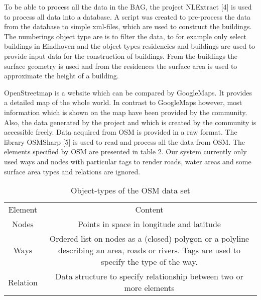 To be able to process all the data in the BAG, the project NLExtract [4] is used to process all data into a database. A script was created to pre-process the data from the database to simple xml-files, which are used to construct the buildings. The numberings object type are is to filter the data, to for example only select buildings in Eindhoven and the object types residencies and buildings are used to provide input data for the construction of buildings. From the buildings the surface geometry is used and from the residences the surface area is used to approximate the height of a building.

OpenStreetmap is a website which can be compared by GoogleMaps. It provides a detailed map of the whole world. In contrast to GoogleMaps however, most information which is shown on the map have been provided by the community. Also, the data generated by the project and which is created by the community is accessible freely.  Data acquired from OSM is provided in a raw format. The library OSMSharp [5] is used to read and process all the data from OSM. The elements specified by OSM are presented in table 2. Our system currently only used ways and nodes with particular tags to render roads, water areas and some surface area types and relations are ignored.

\begin{table}
    \begin{tabular}{cc}
      Element & Content     \\
      Nodes & Points in space in longitude and latitude  \\
      Ways & Ordered list on nodes as a (closed) polygon or a polyline describing an area, roads or rivers. Tags are used to specify the type of the way.  \\
      Relation & Data structure to specify relationship between two or more elements  \\
    \end{tabular}
    \caption{Object-types of the OSM data set}
    \label{Table:ObjectTypesBAG}
\end{table}